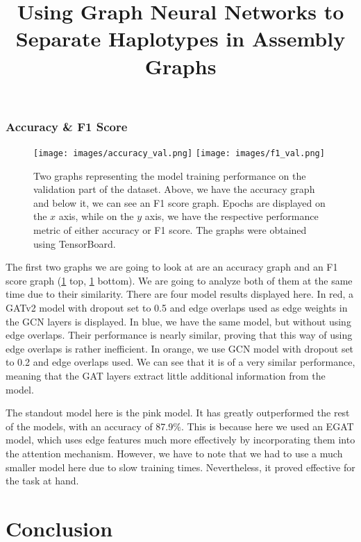 \documentclass[times, utf8, diplomski, english]{fer_eng}
\begin{document}
\subsection{Accuracy \& F1 Score}

\begin{figure}[h]
	\centering
	\texttt{[image: images/accuracy\_val.png]}
	\texttt{[image: images/f1\_val.png]}
	\caption[Accuracy and f1 graph]{Two graphs representing the model training performance on the validation part of the dataset. Above, we have the accuracy graph and below it, we can see an F1 score graph. Epochs are displayed on the $x$ axis, while on the $y$ axis, we have the respective performance metric of either accuracy or F1 score. The graphs were obtained using TensorBoard.}
	\label{fig:accuracy and f1 graph}
\end{figure}

The first two graphs we are going to look at are an accuracy graph and an F1 score graph (\ref{fig:accuracy and f1 graph} top, \ref{fig:accuracy and f1 graph} bottom). We are going to analyze both of them at the same time due to their similarity. There are four model results displayed here. In red, a GATv2 model with dropout set to 0.5 and edge overlaps used as edge weights in the GCN layers is displayed. In blue, we have the same model, but without using edge overlaps. Their performance is nearly similar, proving that this way of using edge overlaps is rather inefficient. In orange, we use GCN model with dropout set to 0.2 and edge overlaps used. We can see that it is of a very similar performance, meaning that the GAT layers extract little additional information from the model.

The standout model here is the pink model. It has greatly outperformed the rest of the models, with an accuracy of 87.9\%. This is because here we used an EGAT model, which uses edge features much more effectively by incorporating them into the attention mechanism. However, we have to note that we had to use a much smaller model here due to slow training times. Nevertheless, it proved effective for the task at hand.

\chapter{Conclusion}





\clearpage

\title{Using Graph Neural Networks to Separate Haplotypes in Assembly Graphs}
\begin{abstract}

\keywords{}
\end{abstract}

\hrtitle{}
\begin{sazetak}

\kljucnerijeci{}
\end{sazetak}
\end{document}
